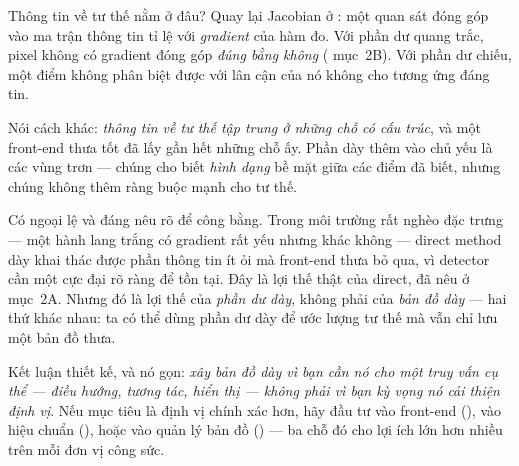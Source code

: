\documentclass[../../vslam.tex]{subfiles}
\begin{document}
Thông tin về tư thế nằm ở đâu? Quay lại Jacobian ở : một quan sát đóng góp vào ma trận thông tin tỉ lệ với \emph{gradient} của hàm đo. Với phần dư quang trắc, pixel không có gradient đóng góp \emph{đúng bằng không} ( mục~2B). Với phần dư chiếu, một điểm không phân biệt được với lân cận của nó không cho tương ứng đáng tin.

Nói cách khác: \emph{thông tin về tư thế tập trung ở những chỗ có cấu trúc}, và một front-end thưa tốt đã lấy gần hết những chỗ ấy. Phần dày thêm vào chủ yếu là các vùng trơn --- chúng cho biết \emph{hình dạng} bề mặt giữa các điểm đã biết, nhưng chúng không thêm ràng buộc mạnh cho tư thế.

Có ngoại lệ và đáng nêu rõ để công bằng. Trong môi trường rất nghèo đặc trưng --- một hành lang trắng có gradient rất yếu nhưng khác không --- direct method dày khai thác được phần thông tin ít ỏi mà front-end thưa bỏ qua, vì detector cần một cực đại rõ ràng để tồn tại. Đây là lợi thế thật của direct, đã nêu ở  mục~2A. Nhưng đó là lợi thế của \emph{phần dư dày}, không phải của \emph{bản đồ dày} --- hai thứ khác nhau: ta có thể dùng phần dư dày để ước lượng tư thế mà vẫn chỉ lưu một bản đồ thưa.

Kết luận thiết kế, và nó gọn: \emph{xây bản đồ dày vì bạn cần nó cho một truy vấn cụ thể --- điều hướng, tương tác, hiển thị --- không phải vì bạn kỳ vọng nó cải thiện định vị}. Nếu mục tiêu là định vị chính xác hơn, hãy đầu tư vào front-end (), vào hiệu chuẩn (), hoặc vào quản lý bản đồ () --- ba chỗ đó cho lợi ích lớn hơn nhiều trên mỗi đơn vị công sức.

\begin{ungdung}
\end{ungdung}
\end{document}
